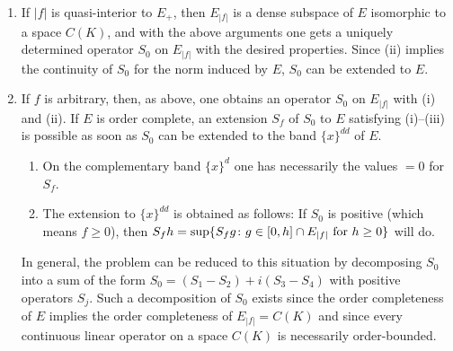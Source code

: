 \begin{enumerate}[\textbullet, wide, labelindent=.25em]

\item 
If\/ $ |f| $ is quasi-interior to $ E_{+} $, then $ E_{|f|} $ is a dense subspace of\/ $ E $ isomorphic to a space $ C(K) $, and with the above arguments one gets a uniquely determined operator $ S_{0} $ on $ E_{|f|} $ with the desired properties.
Since (ii) implies the continuity of\/ $ S_{0} $ for the norm induced by $ E $, $ S_{0} $ can be extended to $ E $.

\item 
If\/ $ f $ is arbitrary, then, as above, one obtains an operator $ S_{0} $ on $ E_{|f|} $ with (i) and (ii).
If\/ $ E $ is order complete, an extension $ S_{f} $ of\/ $ S_{0} $ to $ E $ satisfying (i)--(iii) is possible as soon as $ S_{0} $ can be extended to the band $ \{x\}^{dd} $ of\/ $ E $.
\begin{enumerate}[--, labelindent=2em]
\item
On the complementary band $ \{x\}^{d} $ one has necessarily the values $ = 0 $ for $ S_{f} $.

\item
The extension to $ \{x\}^{dd} $ is obtained as follows:
If\/ $ S_{0} $ is positive (which means $ f \geq 0 $), then 
$ S_{f}h = \sup \{ S_{f}g \colon g \in [0,h] \cap E_{|f|} \text{ for $ h \geq 0 $} \}$ will do.
\end{enumerate}
In general, the problem can be reduced to this situation by decomposing $ S_{0} $ into a sum of the form $ S_{0} = (S_{1} - S_{2}) + i(S_{3} - S_{4}) $ with positive operators $ S_{j} $.
Such a decomposition of\/ $ S_{0} $ exists since the order completeness of\/ $ E $ implies the order completeness of\/ $ E_{|f|} = C(K) $ and since every continuous linear operator on a space $ C(K) $ is necessarily order-bounded.
\end{enumerate}
